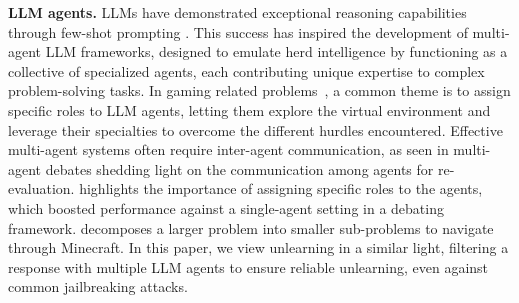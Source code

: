 \textbf{LLM agents.} LLMs have demonstrated exceptional reasoning capabilities through few-shot prompting \cite{wei2023chainofthoughtpromptingelicitsreasoning, yao2023treethoughtsdeliberateproblem, Besta_2024, ganguly2024proofthoughtneurosymbolic, wang2023selfconsistencyimproveschainthought, zhang2024diagramthought}. This success has inspired the development of multi-agent LLM frameworks, designed to emulate herd intelligence by functioning as a collective of specialized agents, each contributing unique expertise to complex problem-solving tasks. In gaming related problems~\cite{wang2023voyageropenendedembodiedagent, xu2024exploringlargelanguagemodels, light2023avalonbenchevaluatingllmsplaying}, a common theme is to assign specific roles to LLM agents, letting them explore the virtual environment and leverage their specialties to overcome the different hurdles encountered. Effective multi-agent systems often require inter-agent communication, as seen in multi-agent debates \cite{du2023improvingfactualityreasoninglanguage,Xiong_2023,chan2023chatevalbetterllmbasedevaluators} shedding light on the communication among agents for re-evaluation. \citet{chan2023chatevalbetterllmbasedevaluators} highlights the importance of assigning specific roles to the agents, which boosted performance against a single-agent setting in a debating framework. \cite{wang2024describeexplainplanselect} decomposes a larger problem into smaller sub-problems to navigate through Minecraft. In this paper, we view unlearning in a similar
light, filtering a response with multiple LLM agents to ensure reliable unlearning, even against common jailbreaking attacks.



